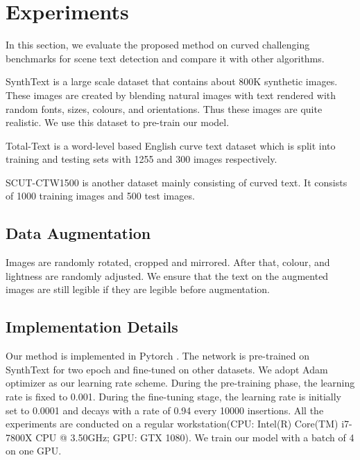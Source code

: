 \documentclass{bmvc2k}
\begin{document}
\section{Experiments}
In this section, we evaluate the proposed method on curved challenging benchmarks for scene text detection and compare it with other algorithms.

SynthText \cite{gupta2016synthetic} is a large scale dataset that contains about 800K synthetic images. These images are created by blending natural images with text rendered with random fonts, sizes, colours, and orientations. Thus these images are quite realistic. We use this dataset to pre-train our model.

Total-Text \cite{ch2017total} is a word-level based English curve text dataset which is split into training and testing sets with 1255 and 300 images respectively.

SCUT-CTW1500 \cite{yuliang2017detecting} is another dataset mainly consisting of curved text. It consists of 1000 training images and 500 test images.
\subsection{Data Augmentation}
Images are randomly rotated, cropped and mirrored. After that, colour, and lightness are randomly adjusted. We ensure that the text on the augmented images are still legible if they are legible before augmentation.
\subsection{Implementation Details}
Our method is implemented in Pytorch \cite{paszke2017automatic}. The network is pre-trained on SynthText for two epoch and fine-tuned on other datasets. We adopt Adam optimizer as our learning rate scheme. During the pre-training phase, the learning rate is fixed to 0.001. During the fine-tuning stage, the learning rate is initially set to 0.0001 and decays with a rate of 0.94 every 10000 insertions. All the experiments are conducted on a regular workstation(CPU: Intel(R) Core(TM) i7-7800X CPU @ 3.50GHz; GPU: GTX 1080). We train our model with a batch of 4 on one GPU.
\end{document}
